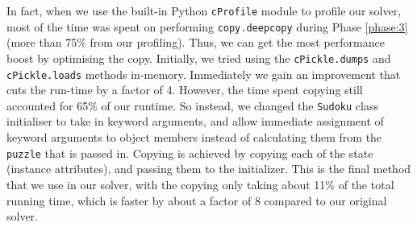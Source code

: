\documentclass[11pt, a4paper]{article}
\begin{document}
In fact, when we use the built-in Python \texttt{cProfile} module to profile our solver, most of the time was spent on performing \texttt{copy.deepcopy} during Phase \ref{phase:3} (more than 75\% from our profiling).
Thus, we can get the most performance boost by optimising the copy.
Initially, we tried using the \texttt{cPickle.dumps} and \texttt{cPickle.loads} methods in-memory.
Immediately we gain an improvement that cuts the run-time by a factor of 4.
However, the time spent copying still accounted for 65\% of our runtime.
So instead, we changed the \texttt{Sudoku} class initialiser to take in keyword arguments, and allow immediate assignment of keyword arguments to object members instead of calculating them from the \texttt{puzzle} that is passed in.
Copying is achieved by copying each of the state (instance attributes), and passing them to the initializer.
This is the final method that we use in our solver, with the copying only taking about 11\% of the total running time, which is faster by about a factor of 8 compared to our original solver.
\end{document}
